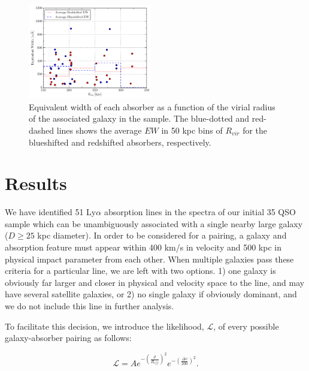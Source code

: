 \documentclass[iop]{emulateapj-rtx4}
\begin{document}
\begin{figure}[h!]
        \centering
        \includegraphics[width=0.48\textwidth]{W(vir)_avgHistograms.pdf}
        \caption{\small{Equivalent width of each absorber as a function of the virial radius of the associated galaxy in the sample. The blue-dotted and red-dashed lines shows the average $EW$ in 50 kpc bins of $R_{vir}$ for the blueshifted and redshifted absorbers, respectively.}}
        \label{w_vir}
        \vspace{5pt}
\end{figure}

\vspace{10pt}


\section{Results}

We have identified 51 Ly$\alpha$ absorption lines in the spectra of our initial 35 QSO sample which can be unambiguously associated with a single nearby large galaxy ($D\geq25$ kpc diameter). In order to be considered for a pairing, a galaxy and absorption feature must appear within 400 km/s in velocity and 500 kpc in physical impact parameter from each other. When multiple galaxies pass these criteria for a particular line, we are left with two options. 1) one galaxy is obviously far larger and closer in physical and velocity space to the line, and may have several satellite galaxies, or 2) no single galaxy if obviously dominant, and we do not include this line in further analysis. 

To facilitate this decision, we introduce the likelihood, $\mathcal{L}$, of every possible galaxy-absorber pairing as follows:

\begin{equation}
	\mathcal{L} = A e^{-(\frac{\rho}{R_{eff}})^2} e^{-(\frac{\Delta v}{200})^2}.
\end{equation}
\end{document}
